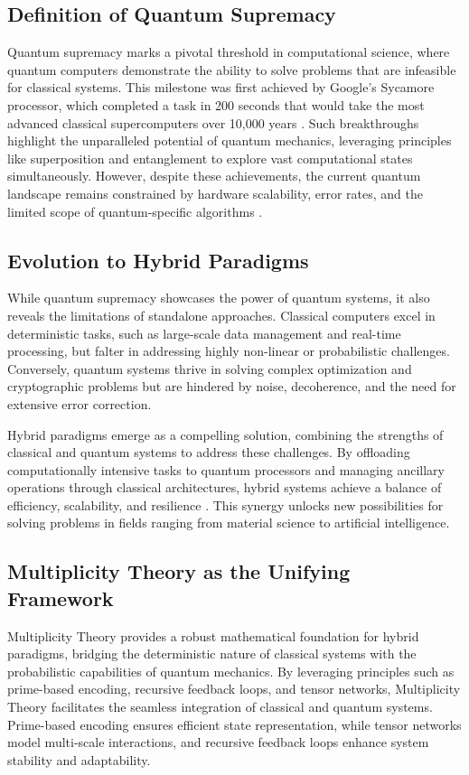 \documentclass{article}
\theoremstyle{plain}
\begin{document}
\subsection{Definition of Quantum Supremacy}
Quantum supremacy marks a pivotal threshold in computational science, where quantum computers demonstrate the ability to solve problems that are infeasible for classical systems. This milestone was first achieved by Google's Sycamore processor, which completed a task in 200 seconds that would take the most advanced classical supercomputers over 10,000 years \cite{arute2019quantum}. Such breakthroughs highlight the unparalleled potential of quantum mechanics, leveraging principles like superposition and entanglement to explore vast computational states simultaneously. However, despite these achievements, the current quantum landscape remains constrained by hardware scalability, error rates, and the limited scope of quantum-specific algorithms \cite{preskill2018quantum}.

\subsection{Evolution to Hybrid Paradigms}
While quantum supremacy showcases the power of quantum systems, it also reveals the limitations of standalone approaches. Classical computers excel in deterministic tasks, such as large-scale data management and real-time processing, but falter in addressing highly non-linear or probabilistic challenges. Conversely, quantum systems thrive in solving complex optimization and cryptographic problems but are hindered by noise, decoherence, and the need for extensive error correction.

Hybrid paradigms emerge as a compelling solution, combining the strengths of classical and quantum systems to address these challenges. By offloading computationally intensive tasks to quantum processors and managing ancillary operations through classical architectures, hybrid systems achieve a balance of efficiency, scalability, and resilience \cite{zhang2021hybrid}. This synergy unlocks new possibilities for solving problems in fields ranging from material science to artificial intelligence.

\subsection{Multiplicity Theory as the Unifying Framework}
Multiplicity Theory provides a robust mathematical foundation for hybrid paradigms, bridging the deterministic nature of classical systems with the probabilistic capabilities of quantum mechanics. By leveraging principles such as prime-based encoding, recursive feedback loops, and tensor networks, Multiplicity Theory facilitates the seamless integration of classical and quantum systems. Prime-based encoding ensures efficient state representation, while tensor networks model multi-scale interactions, and recursive feedback loops enhance system stability and adaptability.
\end{document}
